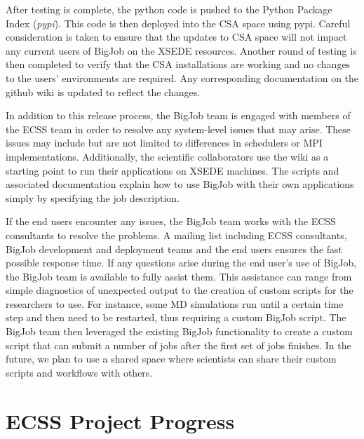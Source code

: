 \documentclass{sig-alternate}
\begin{document}
After testing is complete, the python code is pushed to the Python Package Index
(\textit{pypi}). This code is then deployed into the CSA space using pypi.
Careful consideration is taken to ensure that the updates to CSA space
will not impact any current users of BigJob on the XSEDE resources. Another round of testing 
is then completed to verify that the CSA installations are working and no changes to 
the users' environments are required. Any corresponding documentation on the 
github wiki is updated to reflect the changes.

In addition to this release process, the BigJob team is engaged with members
of the ECSS team in order to resolve any system-level issues that may arise.
These issues may include but are not limited to differences in schedulers or MPI
implementations. Additionally, the scientific collaborators use the wiki as a
starting point to run their applications on XSEDE machines. The scripts and
associated documentation explain how to use BigJob with their own applications
simply by specifying the job description. 

If the end users encounter any issues, the BigJob team works with the ECSS
consultants to resolve the problems. A mailing list including ECSS consultants,
BigJob development and deployment teams and the end users ensures the fast
possible response time. If any questions arise during the end user's use of
BigJob, the BigJob team is available to fully assist them. This assistance can
range from simple diagnostics of unexpected output to  the creation of
custom scripts for the researchers to use. For instance, some MD simulations
run until a certain time step and then need to be restarted, thus requiring a
custom BigJob script. The BigJob team then leveraged the existing BigJob
functionality to create a custom script that can submit a number of jobs after
the first set of jobs finishes. In the future, we plan to use a shared space
where scientists can share their custom scripts and workflows with others.

\section{ECSS Project Progress}


\end{document}
